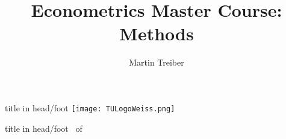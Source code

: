 
\usepackage[english]{babel}
\usepackage{pgf,pgfarrows,pgfnodes,pgfautomata,pgfheaps,pgfshade, hyperref,etex,pictex}
\usepackage{dsfont, bm, amsmath,amssymb, epsfig, graphicx,array,fancybox,}
\usepackage[latin1]{inputenc}
\usepackage[all]{xy}       %

\author{Martin Treiber}
\title{Econometrics Master Course: Methods}

\renewcommand{\baselinestretch}{1}

\beamertemplatetransparentcovereddynamic
{}
\renewcommand{\arraystretch}{1}
 

\geometry{left=1cm, right=0.5cm}

\def\colorize<#1>{%
  \temporal<#1>{\color{structure}}{\color{black}}{\color{black}}}

\graphicspath{{./figures/}}



\newcommand{\frameofframes}{/}
\newcommand{\setframeofframes}[1]{\renewcommand{\frameofframes}{#1}}

\setframeofframes{of}
\makeatletter

{
    \begin{beamercolorbox}[ht=3ex,dp=1.125ex, leftskip=.3cm,rightskip=.3cm plus1fil]{title in head/foot}%
        \texttt{[image: TULogoWeiss.png]}
        \hspace{0.3cm}
        {\insertshorttitle}%
        \hfill%
        {\insertsection}
        \hfill%
        {\insertsubsectionhead}
    \end{beamercolorbox}
}

{
    \begin{beamercolorbox}[ht=2.5ex,dp=1.125ex,leftskip=.3cm,rightskip=.3cm plus1fil]{title in head/foot}%
        {\insertshortauthor}%
        \hfill%
        {\insertframenumber~\frameofframes~\inserttotalframenumber}
    \end{beamercolorbox}
}

\newenvironment{beispiel}%
{{\color{mygreen}\textbf{Beispiel:} }\color{mygreen}}%
{}%

\newenvironment{beispiele}%
{{\color{mygreen}\textbf{Beispiele:} }\color{mygreen}}%
{}%


